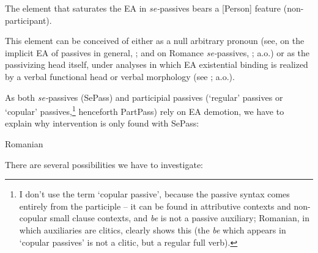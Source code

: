 \documentclass[output=paper]{langsci/langscibook}
\begin{document}
\ea%
    \label{ex:giurgea:26}
    The element that saturates the EA in \textit{se-}passives bears a [Person] feature (non-participant).
\z

This element can be conceived of either as a null arbitrary pronoun (see, on the implicit EA of passives in general, \citealt{Collins2005,Landau2010Explicit}; and on Romance \textit{se-}passives, \citealt{MacDonald2017}; a.o.) or as the passivizing head itself, under analyses in which EA existential binding is realized by a verbal functional head or verbal morphology (see \citealt{Baker1989Passive,Bruening2012}; a.o.).

As both \textit{se-}passives (SePass) and participial passives (‘regular’ passives or ‘copular’ passives,\footnote{I don’t use the term ‘copular passive’, because the passive syntax comes entirely from the participle – it can be found in attributive contexts and non-copular small clause contexts, and \textit{be} is not a passive auxiliary; Romanian, in which auxiliaries are clitics, clearly shows this (the \textit{be} which appears in ‘copular passives’ is not a clitic, but a regular full verb).} henceforth PartPass) rely on EA demotion, we have to explain why intervention is only found with SePass:

\ea%
    Romanian\label{ex:giurgea:27}\\
    \z
\z


There are several possibilities we have to investigate:
\end{document}
